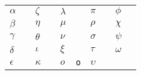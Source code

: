 \documentclass{article}
\newcommand*\s[1]{$#1$&\texttt{\string#1}}
\begin{document}
\thispagestyle{empty}
\begin{tabular}{l@{~}ll@{~}ll@{~}ll@{~}ll@{~}l}
\s\alpha      & \s\zeta   &   \s\lambda  & \s\pi     & \s\phi \\
\s\beta       & \s\eta    &   \s\mu      & \s\rho    &\s\chi \\
\s\gamma      & \s\theta  &   \s\nu      & \s\sigma  &\s\psi\\
\s\delta      & \s\iota   &   \s\xi      & \s\tau    &\s\omega \\
\s\epsilon    & \s\kappa  &   \s o       & \s\upsilon&
\end{tabular}
\end{document}
